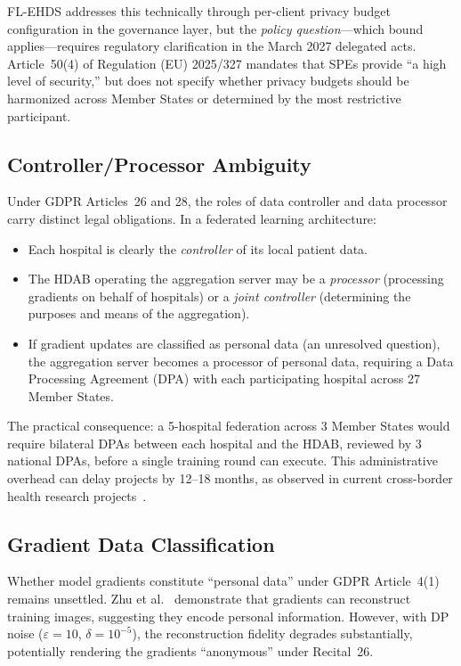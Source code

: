 \documentclass[conference,a4paper]{IEEEtran}
\begin{document}
FL-EHDS addresses this technically through per-client privacy budget configuration in the governance layer, but the \textit{policy question}---which bound applies---requires regulatory clarification in the March 2027 delegated acts. Article~50(4) of Regulation (EU) 2025/327 mandates that SPEs provide ``a high level of security,'' but does not specify whether privacy budgets should be harmonized across Member States or determined by the most restrictive participant.

\subsection{Controller/Processor Ambiguity}

Under GDPR Articles~26 and 28, the roles of data controller and data processor carry distinct legal obligations. In a federated learning architecture:
\begin{itemize}
    \item Each hospital is clearly the \textit{controller} of its local patient data.
    \item The HDAB operating the aggregation server may be a \textit{processor} (processing gradients on behalf of hospitals) or a \textit{joint controller} (determining the purposes and means of the aggregation).
    \item If gradient updates are classified as personal data (an unresolved question), the aggregation server becomes a processor of personal data, requiring a Data Processing Agreement (DPA) with each participating hospital across 27 Member States.
\end{itemize}

The practical consequence: a 5-hospital federation across 3 Member States would require bilateral DPAs between each hospital and the HDAB, reviewed by 3 national DPAs, before a single training round can execute. This administrative overhead can delay projects by 12--18 months, as observed in current cross-border health research projects~\cite{frohlich2025reality}.

\subsection{Gradient Data Classification}

Whether model gradients constitute ``personal data'' under GDPR Article~4(1) remains unsettled. Zhu et al.~\cite{zhu2019deep} demonstrate that gradients can reconstruct training images, suggesting they encode personal information. However, with DP noise ($\varepsilon = 10$, $\delta = 10^{-5}$), the reconstruction fidelity degrades substantially, potentially rendering the gradients ``anonymous'' under Recital~26.
\end{document}
